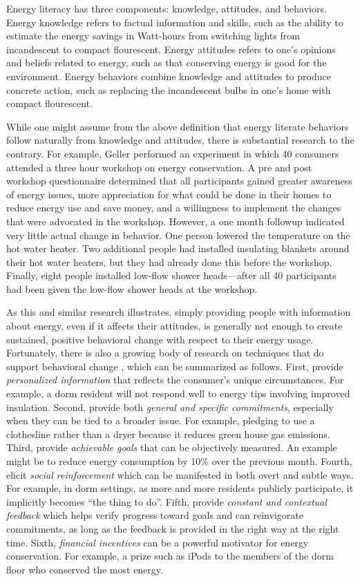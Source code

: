 \documentclass[11pt]{article}
\begin{document}
Energy literacy \cite{DeWaters09b, DeWaters09} has three components:
knowledge, attitudes, and behaviors. Energy knowledge refers to factual 
information and skills, such as the ability to estimate the energy savings
in Watt-hours from switching lights from incandescent to compact
flourescent.   Energy attitudes refers to one's opinions and beliefs
related to energy, such as that conserving energy is good for
the environment.   Energy behaviors combine knowledge and attitudes to
produce concrete action, such as replacing the incandescent bulbs in one's
home with compact flourescent. 

While one might assume from the above definition that energy literate
behaviors follow naturally from knowledge and attitudes, there is
substantial research to the contrary.  For example, Geller \cite{Geller81}
performed an experiment in which 40 consumers attended a three hour
workshop on energy conservation.  A pre and post workshop questionnaire
determined that all participants gained greater awareness of energy issues,
more appreciation for what could be done in their homes to reduce energy
use and save money, and a willingness to implement the changes that were
advocated in the workshop. However, a one month followup indicated very
little actual change in behavior. One person lowered the temperature on the
hot water heater. Two additional people had installed insulating blankets
around their hot water heaters, but they had already done this before the
workshop. Finally, eight people installed low-flow shower heads---after all
40 participants had been given the low-flow shower heads at the workshop.

As this and similar research illustrates, simply providing people with
information about energy, even if it affects their attitudes, is generally
not enough to create sustained, positive behavioral change with respect to
their energy usage.  Fortunately, there is also a growing body of research
on techniques that do support behavioral change
\cite{Becker78,Darby06,Faruqui09,Houwelingen89,Peterson07,Peterson07a,Staats04,Vollink99},
which can be summarized as follows.  First, provide {\em personalized
  information} that reflects the consumer's unique circumstances.  For
example, a dorm resident will not respond well to energy tips involving
improved insulation.  Second, provide both {\em general and specific
  commitments}, especially when they can be tied to a broader issue. For
example, pledging to use a clothesline rather than a dryer because it
reduces green house gas emissions.  Third, provide {\em achievable goals}
that can be objectively measured.  An example might be to reduce energy
consumption by 10\% over the previous month.  Fourth, elicit {\em social
  reinforcement} which can be manifested in both overt and subtle ways.
For example, in dorm settings, as more and more residents publicly
participate, it implicitly becomes ``the thing to do''.  Fifth, provide
{\em constant and contextual feedback} which helps verify progress toward
goals and can reinvigorate commitments, as long as the feedback is provided
in the right way at the right time.  Sixth, {\em financial incentives} can
be a powerful motivator for energy conservation. For example, a prize such
as iPods to the members of the dorm floor who conserved the most energy.
\end{document}
